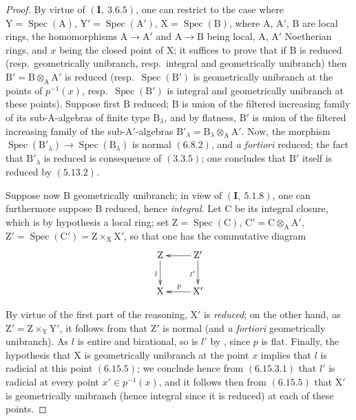 \begin{proof}
By virtue of $(\mathbf{I},~3.6.5)$, one can restrict to the case where $\mathrm{Y}=\operatorname{Spec}(\mathrm{A})$, $\mathrm{Y}'=\operatorname{Spec}(\mathrm{A}')$,
$\mathrm{X}=\operatorname{Spec}(\mathrm{B})$, where $\mathrm{A}$, $\mathrm{A}'$, $\mathrm{B}$ are local rings, the homomorphisms $\mathrm{A}\to\mathrm{A}'$
and $\mathrm{A}\to\mathrm{B}$ being local, $\mathrm{A}$, $\mathrm{A}'$ Noetherian rings, and $x$ being the closed point of $\mathrm{X}$;
it suffices to prove that if $\mathrm{B}$ is reduced (resp.\ geometrically unibranch,
resp.\ integral and geometrically unibranch) then $\mathrm{B}'=\mathrm{B}\otimes_\mathrm{A}\mathrm{A}'$ is reduced (resp.\ $\operatorname{Spec}(\mathrm{B}')$ is geometrically
unibranch at the points of $p^{-1}(x)$, resp.\ $\operatorname{Spec}(\mathrm{B}')$ is integral and geometrically
unibranch at these points). Suppose first $\mathrm{B}$ reduced; $\mathrm{B}$ is
union of the filtered increasing family of its sub-$\mathrm{A}$-algebras of finite type $\mathrm{B}_\lambda$, and by flatness, $\mathrm{B}'$ is
union of the filtered increasing family of the sub-$\mathrm{A}'$-algebras $\mathrm{B}'_\lambda=\mathrm{B}_\lambda\otimes_\mathrm{A}\mathrm{A}'$. Now, the
morphism $\operatorname{Spec}(\mathrm{B}'_\lambda)\to\operatorname{Spec}(\mathrm{B}_\lambda)$ is normal $(6.8.2)$, and \emph{a fortiori} reduced; the fact that $\mathrm{B}'_\lambda$
is reduced is consequence of $(3.3.5)$; one concludes that $\mathrm{B}'$ itself is reduced
by $(5.13.2)$.

Suppose now $\mathrm{B}$ geometrically unibranch; in view of $(\mathbf{I},~5.1.8)$,
one can furthermore suppose $\mathrm{B}$ reduced, hence \emph{integral}. Let $\mathrm{C}$ be its integral closure, which is
by hypothesis a local ring; set $\mathrm{Z}=\operatorname{Spec}(\mathrm{C})$, $\mathrm{C}'=\mathrm{C}\otimes_\mathrm{A}\mathrm{A}'$, $\mathrm{Z}'=\operatorname{Spec}(\mathrm{C}')=\mathrm{Z}\times_\mathrm{X}\mathrm{X}'$,
so that one has the commutative diagram
\[
\xymatrix{
  \mathrm{Z} \ar[d]_{l} & \mathrm{Z}' \ar[l] \ar[d]_{l'} \\
  \mathrm{X} & \mathrm{X}' \ar[l]_{p}
}
\]

By virtue of the first part of the reasoning, $\mathrm{X}'$ is \emph{reduced}; on the other hand, as
$\mathrm{Z}'=\mathrm{Z}\times_\mathrm{Y}\mathrm{Y}'$, it follows from  that $\mathrm{Z}'$ is normal (and \emph{a fortiori} geometrically
unibranch). As $l$ is entire and birational, so is $l'$ by
, since $p$ is flat. Finally, the hypothesis that $\mathrm{X}$ is geometrically
unibranch at the point $x$ implies that $l$ is radicial at this point $(6.15.5)$; we conclude
hence from $(6.15.3.1)$ that $l'$ is radicial at every point $x'\in p^{-1}(x)$, and it follows then from
$(6.15.5)$ that $\mathrm{X}'$ is geometrically unibranch (hence integral since it is reduced)
at each of these points.
\end{proof}

